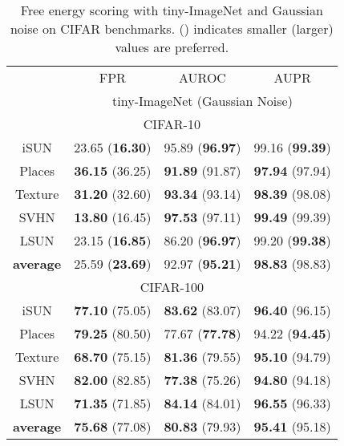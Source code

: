 \documentclass{article}
\begin{document}
\begin{table}[t]
{{}}~~~~
\parbox{.47\linewidth}{
\centering
\caption{Free energy scoring with tiny-ImageNet and Gaussian noise on CIFAR benchmarks.  () indicates smaller (larger) values are preferred.} \label{tab: free energy tiny}
\vspace{5pt}
\scriptsize{
\begin{tabular}{c|ccc}
\toprule[1.5pt]
                   & FPR      & AUROC        & AUPR       \\
                   \cline{2-4} 
\multirow{-2}{*}{} & \multicolumn{3}{c}{tiny-ImageNet (Gaussian Noise)} \\
\midrule[0.6pt]
\multicolumn{4}{c}{\cellcolor{greyL}CIFAR-10} \\
\midrule[0.6pt]
iSUN               & {23.65} (\textbf{16.30}) & {95.89} (\textbf{96.97}) & {99.16} (\textbf{99.39}) \\
Places        & \textbf{36.15} (36.25) & \textbf{91.89} (91.87) & \textbf{97.94} (97.94) \\
Texture            & \textbf{31.20} (32.60) & \textbf{93.34} (93.14) & \textbf{98.39} (98.08) \\
SVHN               & \textbf{13.80} (16.45) & \textbf{97.53} (97.11) & \textbf{99.49} (99.39) \\
LSUN             & {23.15} (\textbf{16.85}) & {86.20} (\textbf{96.97}) & {99.20} (\textbf{99.38}) \\
\midrule
\textbf{average}   & {25.59} (\textbf{23.69}) & {92.97} (\textbf{95.21}) & \textbf{98.83} (98.83) \\ \midrule[1pt]
\multicolumn{4}{c}{\cellcolor{greyL}CIFAR-100} \\
\midrule[1pt]
iSUN               & \textbf{77.10} (75.05) & \textbf{83.62} (83.07) & \textbf{96.40} (96.15) \\ 
Places        & \textbf{79.25} (80.50) & {77.67} (\textbf{77.78}) & {94.22} (\textbf{94.45}) \\
Texture            & \textbf{68.70} (75.15) & \textbf{81.36} (79.55) & \textbf{95.10} (94.79) \\
SVHN               & \textbf{82.00} (82.85) & \textbf{77.38} (75.26) & \textbf{94.80} (94.18) \\
LSUN               & \textbf{71.35} (71.85) & \textbf{84.14} (84.01) & \textbf{96.55} (96.33) \\
\midrule
\textbf{average}   & \textbf{75.68} (77.08) & \textbf{80.83} (79.93) & \textbf{95.41} (95.18) \\ \bottomrule[1.5pt]      
\end{tabular}
}}
\end{table}
\end{document}
